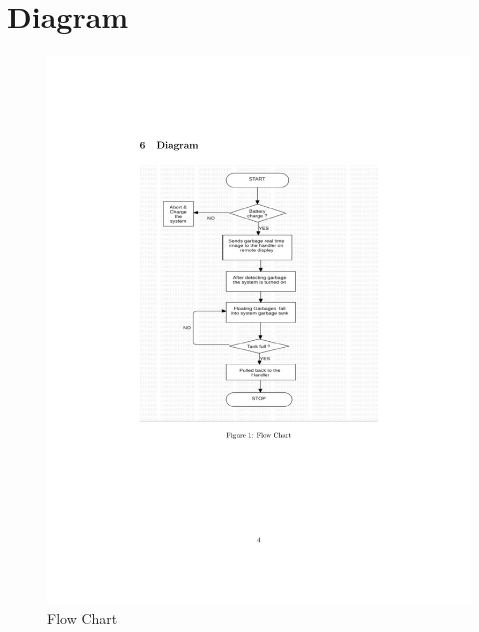 \documentclass{article}
\begin{document}
\section{Diagram}
\begin{figure}[!htb]
	\includegraphics[width=\linewidth]{flowchart.png}
	\caption{Flow Chart}
\end{figure}
\end{document}
